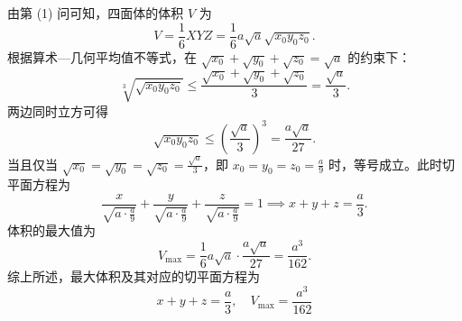 \begin{solution}
    由第 (1) 问可知，四面体的体积 $V$ 为
    \begin{equation}
        V = \frac{1}{6} XYZ = \frac{1}{6} a\sqrt{a} \sqrt{x_0 y_0 z_0}.
    \end{equation}
    根据算术—几何平均值不等式，在 $\sqrt{x_0} + \sqrt{y_0} + \sqrt{z_0} = \sqrt{a}$ 的约束下：
    \begin{equation}
        \sqrt[3]{\sqrt{x_0 y_0 z_0}} \le \frac{\sqrt{x_0} + \sqrt{y_0} + \sqrt{z_0}}{3} = \frac{\sqrt{a}}{3}.
    \end{equation}
    两边同时立方可得
    \begin{equation}
        \sqrt{x_0 y_0 z_0} \le \left( \frac{\sqrt{a}}{3} \right)^3 = \frac{a\sqrt{a}}{27}.
    \end{equation}
    当且仅当 $\sqrt{x_0} = \sqrt{y_0} = \sqrt{z_0} = \frac{\sqrt{a}}{3}$，即 $x_0 = y_0 = z_0 = \frac{a}{9}$ 时，等号成立。此时切平面方程为
    \begin{equation}
        \frac{x}{\sqrt{a \cdot \frac{a}{9}}} + \frac{y}{\sqrt{a \cdot \frac{a}{9}}} + \frac{z}{\sqrt{a \cdot \frac{a}{9}}} = 1 \implies x + y + z = \frac{a}{3}.
    \end{equation}
    体积的最大值为
    \begin{equation}
        V_{\max} = \frac{1}{6} a\sqrt{a} \cdot \frac{a\sqrt{a}}{27} = \frac{a^3}{162}.
    \end{equation}
    综上所述，最大体积及其对应的切平面方程为
    \begin{equation}
        \boxed{x + y + z = \frac{a}{3}, \quad V_{\max} = \frac{a^3}{162}}
    \end{equation}
\end{solution}

\endinput
